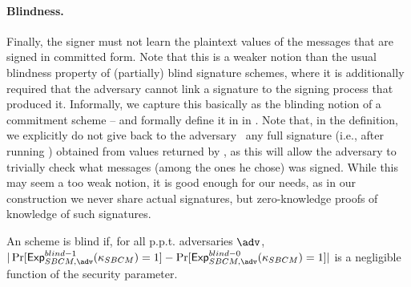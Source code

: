 \paragraph{Blindness.} %
Finally, the signer must not learn the plaintext values of the messages that are
signed in committed form. Note that this is a weaker notion than the usual
blindness property of (partially) blind signature schemes, where it is
additionally required that the adversary cannot link a signature to the signing
process that produced it. Informally, we capture this basically as the blinding
notion of a commitment scheme -- and formally define it in \ExpSBCMBlindb in
.
%
Note that, in the definition, we explicitly do not give back to the adversary
\adv~any full signature (i.e., after running \SBCMUnblind) obtained from values
returned by \adv, as this will allow the adversary to trivially check what
messages (among the ones he chose) was signed. While this may seem a too weak
notion, it is good enough for our needs, as in our \UAS construction we never
share actual signatures, but zero-knowledge proofs of knowledge of such
signatures.

An \SBCM scheme is blind if, for all p.p.t.
adversaries $\adv$, $|\Pr[\ExpSBCMBlindo(\SBCMsecpar) = 1] -
\Pr[\ExpSBCMBlindz(\SBCMsecpar) = 1]|$ is a negligible function of the security
parameter.

